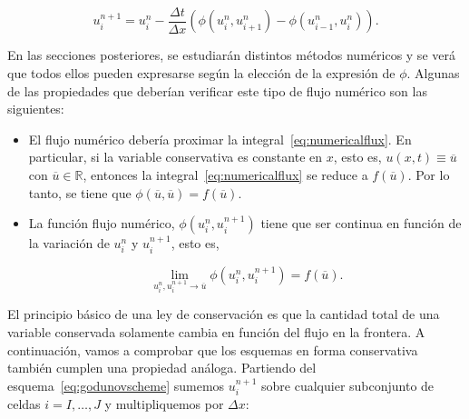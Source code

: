 \begin{equation}\label{eq:onestepscheme}
  u^{n+1}_{i}=
  u^{n}_{i}-
  \frac{\Delta t}{\Delta x}
  \left(
  \phi\left(u^{n}_{i},u^{n}_{i+1}\right)-
  \phi\left(u^{n}_{i-1},u^{n}_{i}\right)
  \right).
\end{equation}

En las secciones posteriores, se estudiarán distintos métodos
numéricos y se verá que todos ellos pueden expresarse según la
elección de la expresión de $\phi$.
Algunas de las propiedades que deberían verificar este tipo de flujo
numérico son las siguientes:

\begin{itemize}
  \item

        El flujo numérico debería proximar la integral~\eqref{eq:numericalflux}.
        En particular, si la variable conservativa es constante en
        $x$, esto es, $u\left(x,t\right)\equiv\overline{u}$ con
        $\overline{u}\in\mathbb{R}$, entonces la
        integral~\eqref{eq:numericalflux} se reduce a
        $f\left(\overline{u}\right)$.
        Por lo tanto, se tiene que
        \begin{math}
          \phi
          \left(
          \overline{u},
          \overline{u}
          \right)=
          f\left(\overline{u}\right).
        \end{math}

  \item

        La función flujo numérico,
        \begin{math}
          \phi\left(u^{n}_{i},u^{n+1}_{i}\right)
        \end{math}
        tiene que ser continua en función de la
        variación de $u^{n}_{i}$ y $u^{n+1}_{i}$,
        esto es,

        \begin{equation*}
          \lim_{u^{n}_{i},u^{n+1}_{i}\to\overline{u}}
          \phi\left(u^{n}_{i},u^{n+1}_{i}\right)=
          f\left(\overline{u}\right).
        \end{equation*}
\end{itemize}

El principio básico de una ley de conservación es que la cantidad
total de una variable conservada solamente cambia en función del
flujo en la frontera.
A continuación, vamos a comprobar que los esquemas en forma
conservativa también cumplen una propiedad análoga.
Partiendo del esquema~\eqref{eq:godunovscheme} sumemos $u^{n+1}_{i}$
sobre cualquier subconjunto de celdas $i=I,\dotsc,J$ y multipliquemos
por $\Delta x$:

